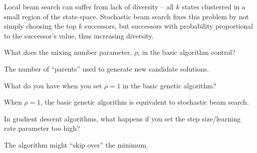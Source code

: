 \begin{questions}
\begin{solution}[1.75in]
Local beam search can suffer from lack of diversity -- all $k$ states clusterred in a small region of the state space.  Stochastic beam search fixes this problem by not simply choosing the top $k$ successors, but successors with probability proportional to the successor's value, thus increasing diversity.
\end{solution}

\question What does the mixing number parameter, $\rho$, in the basic algorithm control?

\begin{solution}[.5in]
The number of ``parents'' used to generate new candidate solutions.
\end{solution}

\question What do you have when you set $\rho = 1$ in the basic genetic algorithm?

\begin{solution}[.5in]
When $\rho = 1$, the basic genetic algorithm is equivalent to stochastic beam search.
\end{solution}

\question In gradient descent algorithms, what happens if you set the step size/learning rate parameter too high?

\begin{solution}[.5in]
The algorithm might ``skip over'' the minimum.
\end{solution}

\end{questions}



